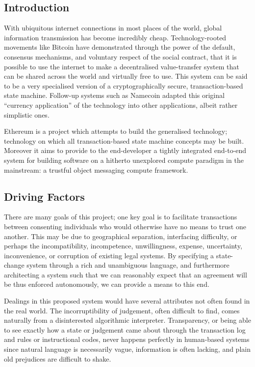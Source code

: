 \documentclass[9pt,oneside]{amsart}
\begin{document}
\setlength{\columnsep}{20pt}
\begin{multicols}{2}

\section{Introduction}\label{sec:introduction}

With ubiquitous internet connections in most places of the world, global information transmission has become incredibly cheap. Technology-rooted movements like Bitcoin have demonstrated through the power of the default, consensus mechanisms, and voluntary respect of the social contract, that it is possible to use the internet to make a decentralised value-transfer system that can be shared across the world and virtually free to use. This system can be said to be a very specialised version of a cryptographically secure, transaction-based state machine. Follow-up systems such as Namecoin adapted this original ``currency application'' of the technology into other applications, albeit rather simplistic ones.

Ethereum is a project which attempts to build the generalised technology; technology on which all transaction-based state machine concepts may be built. Moreover it aims to provide to the end-developer a tightly integrated end-to-end system for building software on a hitherto unexplored compute paradigm in the mainstream: a trustful object messaging compute framework.

\subsection{Driving Factors} \label{ch:driving}

There are many goals of this project; one key goal is to facilitate transactions between consenting individuals who would otherwise have no means to trust one another. This may be due to geographical separation, interfacing difficulty, or perhaps the incompatibility, incompetence, unwillingness, expense, uncertainty, inconvenience, or corruption of existing legal systems. By specifying a state-change system through a rich and unambiguous language, and furthermore architecting a system such that we can reasonably expect that an agreement will be thus enforced autonomously, we can provide a means to this end.

Dealings in this proposed system would have several attributes not often found in the real world. The incorruptibility of judgement, often difficult to find, comes naturally from a disinterested algorithmic interpreter. Transparency, or being able to see exactly how a state or judgement came about through the transaction log and rules or instructional codes, never happens perfectly in human-based systems since natural language is necessarily vague, information is often lacking, and plain old prejudices are difficult to shake.


\end{multicols}
\end{document}
